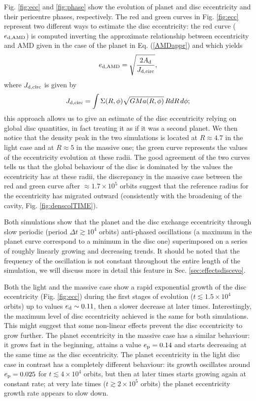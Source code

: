 \documentclass[usenatbib,a4paper,times,fleqn]{mnras}
\begin{document}
Fig. \ref{fig:ecc} and \ref{fig:phase} show the evolution of planet and disc eccentricity and their pericentre phases, respectively. The red and green curves in Fig. \ref{fig:ecc} represent two different ways to estimate the disc eccentricity: the red curve ($e_{\rm d,AMD}$) is computed inverting the approximate relationship between eccentricity and
AMD given in the case of the planet in Eq. (\ref{AMDappr}) and which yields  
\begin{equation}
e_{\rm d,AMD}=\sqrt{\frac{2A_{\rm d}}{J_{\rm d,circ}}},\label{redcurve}
\end{equation}
where $J_{\rm d,circ}$ is given by
\begin{equation}
J_{\rm d,circ}=\int \Sigma(R,\phi) \sqrt{GMa(R,\phi)}\, R dR\,d\phi;
\end{equation}
this approach allows us to give an estimate of the disc eccentricity relying on global disc quantities, in fact treating it as if it was a second planet.
We then notice that the density peak in the two simulations is located at $R\approx 4.7$ in the light case and at $R\approx 5$ in the massive one; the green curve represents the values of the eccentricity evolution at these radii.
The good agreement of the two curves tells us that the global behaviour of the disc is dominated by the values the eccentricity has at these radii, the discrepancy in the massive case between the red and green curve after $\approx 1.7\times 10^5$ orbits suggest that the reference radius for the eccentricity has migrated outward (consistently with the broadening of the cavity, Fig. \ref{fig:denscolTIME}).

Both simulations show that the planet and the disc exchange eccentricity through slow periodic (period $\Delta t\gtrsim 10^4$ orbits) anti-phased oscillations (a maximum in the planet curve correspond to a minimum in the disc one) superimposed on a series of roughly linearly growing and decreasing trends. It should be noted that the frequency of the oscillation is not constant throughout the entire length of the simulation, we will discuss more in detail this feature in Sec. \ref{sec:effectsdiscevo}.

Both the light and the massive case show a rapid exponential growth of the disc eccentricity (Fig. \ref{fig:ecc}) during the first stages of evolution ($t\lesssim 1.5\times10^4$ orbits) up to values $e_{\rm d}\sim 0.11$, then a slower decrease at later times. Interestingly, the maximum level of disc eccentricity achieved is the same for both simulations. This might suggest that some non-linear effects prevent the disc eccentricity to grow further. The planet eccentricity in the massive case has a similar behaviour: it grows fast in the beginning, attains a value $e_{\rm p}=0.14$ and starts decreasing at the same time as the disc eccentricity. The planet eccentricity in the light disc case in contrast has a completely different behaviour: its growth oscillates around $e_{\rm p}=0.025$ for $t\lesssim 4\times10^4$ orbits, but then at later times starts growing again at constant rate; at very late times ($t\gtrsim 2\times 10^5$ orbits) the planet eccentricity growth rate appears to slow down. 
\end{document}
